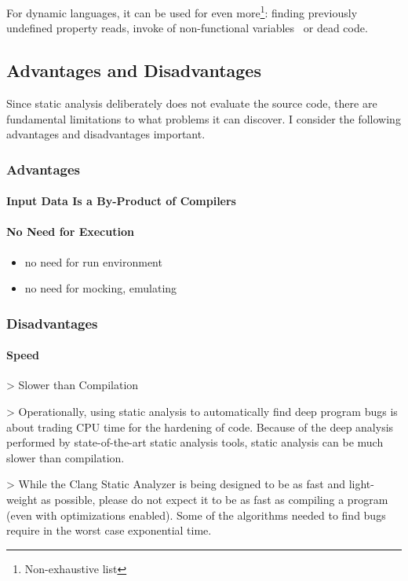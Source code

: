 For dynamic languages, it can be used for even more\footnote{Non-exhaustive list}: finding previously undefined property reads, invoke of non-functional variables~\cite{jensen_type_2009} or dead code.

\subsection{Advantages and Disadvantages}

Since static analysis deliberately does not evaluate the source code, there are fundamental limitations to what problems it can discover. I consider the following advantages and disadvantages important.

\subsubsection{Advantages}
\paragraph{Input Data Is a By-Product of Compilers}

\paragraph{No Need for Execution}
\begin{itemize}
  \item no need for run environment
  \item no need for mocking, emulating
\end{itemize}

\subsubsection{Disadvantages}
\paragraph{Speed}
  > Slower than Compilation

  > Operationally, using static analysis to automatically find deep program bugs is about trading CPU time for the hardening of code. Because of the deep analysis performed by state-of-the-art static analysis tools, static analysis can be much slower than compilation.

  > While the Clang Static Analyzer is being designed to be as fast and light-weight as possible, please do not expect it to be as fast as compiling a program (even with optimizations enabled). Some of the algorithms needed to find bugs require in the worst case exponential time.

